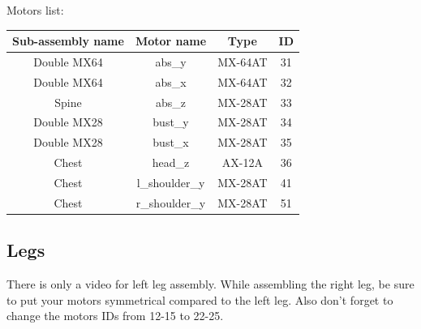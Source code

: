 \documentclass{article}
\begin{document}
Motors list:

\begin{center}

\begin{tabular}{|c|c|c|c|}
\hline 
Sub-assembly name & Motor name & Type & ID \\ 
\hline 

Double MX64 & abs\_y & MX-64AT & 31 \\ 
\hline 
Double MX64 & abs\_x & MX-64AT & 32 \\
\hline 
Spine & abs\_z & MX-28AT & 33 \\
\hline 
Double MX28 & bust\_y & MX-28AT & 34 \\
\hline 
Double MX28 & bust\_x & MX-28AT & 35 \\
\hline 
Chest & head\_z & AX-12A & 36 \\ 
\hline 
Chest & l\_shoulder\_y & MX-28AT & 41 \\
\hline 
Chest & r\_shoulder\_y & MX-28AT & 51 \\
\hline 
\end{tabular} 
\end{center}

\subsection{Legs} 
 

There is only a video for left leg assembly. While assembling the right leg, be sure to put your motors symmetrical compared to the left leg. Also don't forget to change the motors IDs from 12-15 to 22-25.
\end{document}
